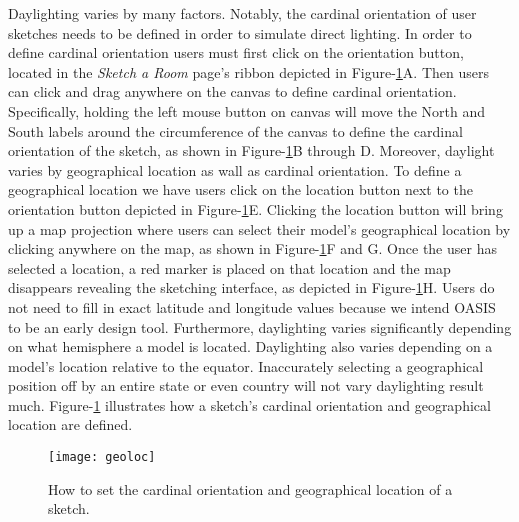 		Daylighting varies by many factors.
		Notably, the cardinal orientation of user sketches needs to be defined in order to simulate direct lighting.
		In order to define cardinal orientation users must first click on the orientation button, located in the \textit{Sketch a Room} page's ribbon depicted in Figure-\ref{fig:geoloc}A.
		Then users can click and drag anywhere on the canvas to define cardinal orientation.
		Specifically, holding the left mouse button on canvas will move the North and South labels around the circumference of the canvas to define the cardinal orientation of the sketch, as shown in Figure-\ref{fig:geoloc}B through D.
		Moreover, daylight varies by geographical location as wall as cardinal orientation.
		To define a geographical location we have users click on the location button next to the orientation button depicted in Figure-\ref{fig:geoloc}E.
		Clicking the location button will bring up a map projection where users can select their model's geographical location by clicking anywhere on the map, as shown in Figure-\ref{fig:geoloc}F and G.
		Once the user has selected a location, a red marker is placed on that location and the map  disappears revealing the sketching interface, as depicted in Figure-\ref{fig:geoloc}H.
		Users do not need to fill in exact latitude and longitude values because we intend OASIS to be an early design tool. 
		Furthermore, daylighting varies significantly depending on what hemisphere a model is located. Daylighting also varies depending on a model's location relative to the equator.
		Inaccurately selecting a geographical position off by an entire state or even country will not vary daylighting result much.
		Figure-\ref{fig:geoloc} illustrates how a sketch's cardinal orientation and geographical location are defined.

		\begin{figure}[h]
		\centering
		\texttt{[image: geoloc]}
		\caption{
		How to set the cardinal orientation and geographical location of a sketch.}
		\label{fig:geoloc}
		\end{figure}

